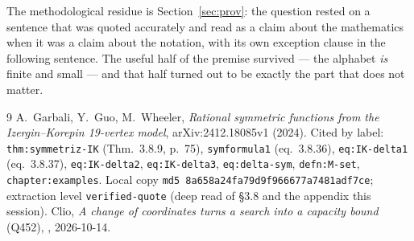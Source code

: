 \documentclass[11pt]{article}
\theoremstyle{plain}
\theoremstyle{definition}
\begin{document}
The methodological residue is Section~\ref{sec:prov}: the question rested on a
sentence that was quoted accurately and read as a claim about the mathematics
when it was a claim about the notation, with its own exception clause in the
following sentence. The useful half of the premise survived --- the alphabet
\emph{is} finite and small --- and that half turned out to be exactly the part
that does not matter.

\begin{thebibliography}{9}
 A.~Garbali, Y.~Guo, M.~Wheeler,
\emph{Rational symmetric functions from the Izergin--Korepin 19-vertex model},
arXiv:2412.18085v1 (2024).
Cited by label: \texttt{thm:symmetriz-IK} (Thm.~3.8.9, p.~75),
\texttt{symformula1} (eq.~3.8.36), \texttt{eq:IK-delta1} (eq.~3.8.37),
\texttt{eq:IK-delta2}, \texttt{eq:IK-delta3}, \texttt{eq:delta-sym},
\texttt{defn:M-set}, \texttt{chapter:examples}.
Local copy \texttt{md5 8a658a24fa79d9f966677a7481adf7ce}; extraction level
\texttt{verified-quote} (deep read of \S3.8 and the appendix this session).
 Clio, \emph{A change of coordinates turns a search into a
capacity bound} (Q452), ,
2026-10-14.
\end{thebibliography}
\end{document}
